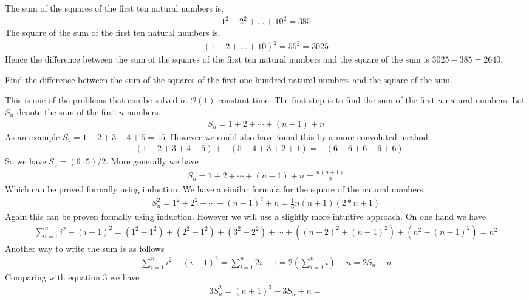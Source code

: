 
\begin{ProjectEuler}{6}
The sum of the squares of the first ten natural numbers is,
%
\begin{align*}
	1^2 + 2^2 + \ldots + 10^2 = 385
\end{align*}
%
The square of the sum of the first ten natural numbers is,
%
\begin{align*}
	(1 + 2 + \ldots + 10)^2 = 55^2 = 3025
\end{align*}
%
Hence the difference between the sum of the squares of the first ten natural numbers and the square of the sum is $3025 - 385 = 2640$. 

Find the difference between the sum of the squares of the first one hundred natural numbers and the square of the sum.
\end{ProjectEuler}

This is one of the problems that can be solved in $\mathcal{O}(1)$ constant time. The first step is to find the sum of 
the first $n$ natural numbers. Let $S_n$ denote the sum of the first $n$ numbers.
%
\begin{align*}
	S_n = 1 + 2 + \cdots + (n-1) + n
\end{align*}
%
As an example $S_5 = 1 + 2 + 3 + 4 + 5 = 15$. However we could also have found this by a more convoluted method
%
\begin{align*}
 	  & (1 + 2 + 3 + 4 + 5)
	+ & (5 + 4 + 3 + 2 + 1)
	= & (6 + 6 + 6 + 6 + 6)
\end{align*}
%
So we have $S_5 = (6 \cdot 5) /2$. More generally we have
%
\begin{align*}
	S_n = 1 + 2 + \cdots + (n-1) + n = \frac{n(n+1)}{2}
\end{align*}
%
Which can be proved formally using induction. We have a similar formula for the square of the natural numbers
%
\begin{align*}
	S_n^2 = 1^2 + 2^2 + \cdots + (n-1)^2 + n = \frac{1}{6} n(n+1)(2*n+1)
\end{align*}
%
Again this can be proven formally using induction. However we will use a slightly more intuitive approach. On one hand we have
%
\begin{align*}
	\sum_{i=1}^{n} i^2 - (i-1)^2
	= (1^2-1^2) + (2^2-1^2) + (3^2 - 2^2) + \cdots + ((n-2)^2 + (n-1)^2) + (n^2 - (n-1)^2) 
	= n^2
\end{align*}
%
Another way to write the sum is as follows
%
\begin{align*}
	  \sum_{i=1}^{n} i^2 - (i-1)^2
	= \sum_{i=1}^n 2 i - 1
	= 2 \left( \sum_{i=1}^n i \right)  - n
	= 2 S_n - n
\end{align*}
%
Comparing with equation 3 we have
%
\begin{align*}
	3 S_n^2 = (n+1)^3 - 3 S_n + n
	        = 
\end{align*}